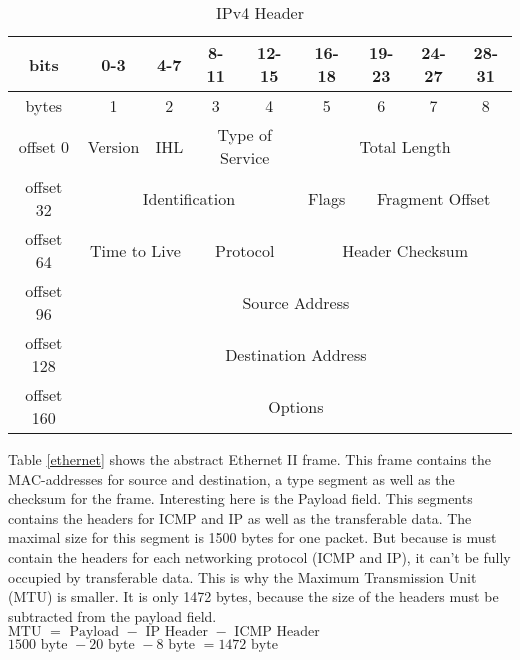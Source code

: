 \begin{table}[]
	\centering
	\label{ipv4-header}
	\begin{tabular}{|c|c|c|c|c|c|c|c|c|}
		\hline
		bits       & 0-3               & 4-7           & 8-11             & 12-15             & 16-18  & 19-23      & 24-27      & 28-31      \\ \hline
		bytes      & 1                 & 2             & 3                & 4                 & 5      & 6          & 7          & 8          \\ \hline
		offset 0   & Version           & IHL           & \multicolumn{2}{c|}{Type of Service} & \multicolumn{4}{c|}{Total Length}             \\ \hline
		offset 32  & \multicolumn{4}{c|}{Identification}                                      & Flags  & \multicolumn{3}{c|}{Fragment Offset} \\ \hline
		offset 64  & \multicolumn{2}{c|}{Time to Live} & \multicolumn{2}{c|}{Protocol}        & \multicolumn{4}{c|}{Header Checksum}          \\ \hline
		offset 96  & \multicolumn{8}{c|}{Source Address}                                                                                      \\ \hline
		offset 128 & \multicolumn{8}{c|}{Destination Address}                                                                                 \\ \hline
		offset 160 & \multicolumn{8}{c|}{Options}                                                                                             \\ \hline
	\end{tabular}
	\caption{IPv4 Header}
\end{table}

Table \ref{ethernet} shows the abstract Ethernet II frame. This frame contains the MAC-addresses for source and destination, a type segment as well as the checksum for the frame. Interesting here is the Payload field. This segments contains the headers for ICMP and IP as well as the transferable data. The maximal size for this segment is 1500 bytes for one packet. But because is must contain the headers for each networking protocol (ICMP and IP), it can't be fully occupied by transferable data. This is why the Maximum Transmission Unit (MTU) is smaller. It is only 1472 bytes, because the size of the headers must be subtracted from the payload field.
$ \text{MTU } = \text{ Payload } - \text{ IP Header } - \text{ ICMP Header }$\\
$ 1500\text{ byte } - 20 \text{ byte } - 8 \text{ byte } = 1472 \text{ byte }$

